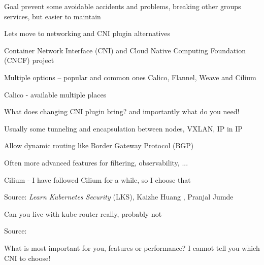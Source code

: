 \documentclass[Screen16to9,17pt]{foils}
\begin{document}

Goal prevent some avoidable accidents and problems, breaking other groups services, but easier to maintain



Lets move to networking and CNI plugin alternatives

\begin{list2}
\item Container Network Interface (CNI) and Cloud Native Computing Foundation (CNCF) project\\
\item Multiple options -- popular and common ones Calico, Flannel, Weave and Cilium
\item Calico - available multiple places
\item What does changing CNI plugin bring? and importantly what do you need!
\item Usually some tunneling and encapsulation between nodes, VXLAN, IP in IP
\item Allow dynamic routing like Border Gateway Protocol (BGP)
\item Often more advanced features for filtering, observability, ...
\item Cilium - I have followed Cilium for a while, so I choose that
\end{list2}


Source: \emph{Learn Kubernetes Security} (LKS), Kaizhe Huang , Pranjal Jumde

\begin{list2}
\item Can you live with kube-router really, probably not
\end{list2}


Source:  

\begin{list2}
\item What is most important for you, features or performance? I cannot tell you which CNI to choose!
\end{list2}

\end{document}
